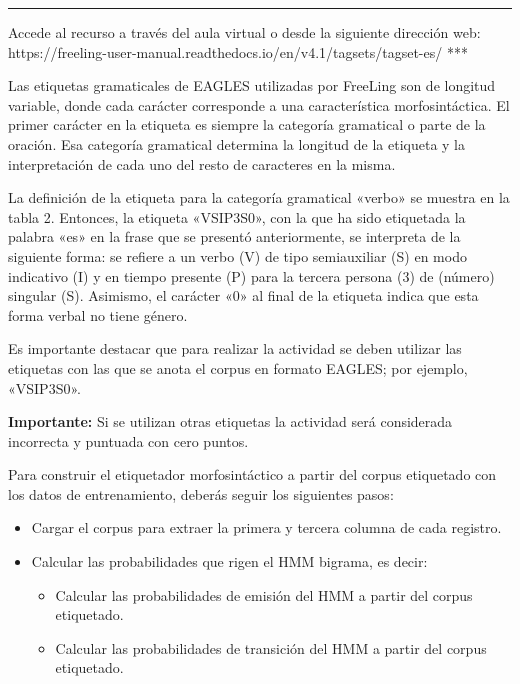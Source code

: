 \documentclass[12pt,a4paper,table]{article}
\providecommand{\tightlist}{%
      \setlength{\itemsep}{0pt}\setlength{\parskip}{0pt}}
\begin{document}
\begin{center}\rule{0.5\linewidth}{0.5pt}\end{center}

Accede al recurso a través del aula virtual o desde la siguiente
dirección web:
https://freeling-user-manual.readthedocs.io/en/v4.1/tagsets/tagset-es/
***

Las etiquetas gramaticales de EAGLES utilizadas por FreeLing son de
longitud variable, donde cada carácter corresponde a una característica
morfosintáctica. El primer carácter en la etiqueta es siempre la
categoría gramatical o parte de la oración. Esa categoría gramatical
determina la longitud de la etiqueta y la interpretación de cada uno del
resto de caracteres en la misma.

La definición de la etiqueta para la categoría gramatical «verbo» se
muestra en la tabla 2. Entonces, la etiqueta «VSIP3S0», con la que ha
sido etiquetada la palabra «es» en la frase que se presentó
anteriormente, se interpreta de la siguiente forma: se refiere a un
verbo (V) de tipo semiauxiliar (S) en modo indicativo (I) y en tiempo
presente (P) para la tercera persona (3) de (número) singular (S).
Asimismo, el carácter «0» al final de la etiqueta indica que esta forma
verbal no tiene género.

Es importante destacar que para realizar la actividad se deben utilizar
las etiquetas con las que se anota el corpus en formato EAGLES; por
ejemplo, «VSIP3S0».

\textbf{Importante:} Si se utilizan otras etiquetas la actividad será
considerada incorrecta y puntuada con cero puntos.

Para construir el etiquetador morfosintáctico a partir del corpus
etiquetado con los datos de entrenamiento, deberás seguir los siguientes
pasos:

\begin{itemize}
\tightlist
\item
  Cargar el corpus para extraer la primera y tercera columna de cada
  registro.
\item
  Calcular las probabilidades que rigen el HMM bigrama, es decir:

  \begin{itemize}
  \tightlist
  \item
    Calcular las probabilidades de emisión del HMM a partir del corpus
    etiquetado.
  \item
    Calcular las probabilidades de transición del HMM a partir del
    corpus etiquetado.
  \end{itemize}
\end{itemize}
\end{document}
